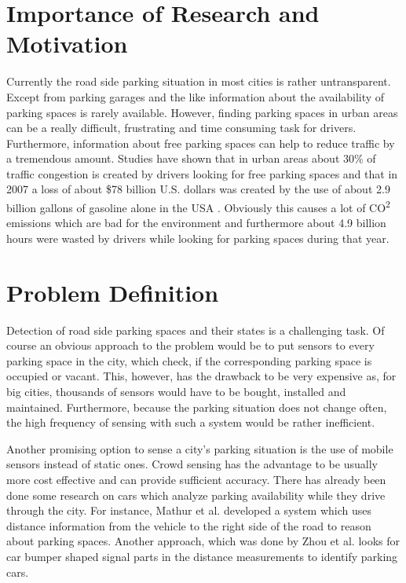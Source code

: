 \documentclass[11pt,a4paper,titlepage,
chapterprefix,headsepline,parskip,pdftex,
,pointlessnumbers,bibtotoc]{article}
\begin{document}


%
%
%
%

\newpage
{}

\section{Importance of Research and Motivation}
Currently the road side parking situation in most cities is rather untransparent. Except from parking garages and the like information about the availability of parking spaces is rarely available. However, finding parking spaces in urban areas can be a really difficult, frustrating and time consuming task for drivers. Furthermore, information about free parking spaces can help to reduce traffic by a tremendous amount. Studies have shown that in urban areas about 30\% of traffic congestion is created by drivers looking for free parking spaces \cite{Nawaz:2013:PSB:2500423.2500438} and that in 2007 a loss of about \$78 billion U.S. dollars was created by the use of about 2.9 billion gallons of gasoline alone in the USA \cite{TexasMobilityReport}. Obviously this causes a lot of CO\textsuperscript{2} emissions which are bad for the environment and furthermore about 4.9 billion hours were wasted by drivers while looking for parking spaces during that year. 

\section{Problem Definition}

Detection of road side parking spaces and their states is a challenging task. Of course an obvious approach to the problem would be to put sensors to every parking space in the city, which check, if the corresponding parking space is occupied or vacant. This, however, has the drawback to be very expensive as, for big cities, thousands of sensors would have to be bought, installed and maintained. Furthermore, because the parking situation does not change often, the high frequency of sensing with such a system would be rather inefficient.

Another promising option to sense a city's parking situation is the use of mobile sensors instead of static ones. Crowd sensing has the advantage to be usually more cost effective and can provide sufficient accuracy.
There has already been done some research on cars which analyze parking availability while they drive through the city. For instance, Mathur et al. \cite{Mathur:2010:PDS:1814433.1814448} developed a system which uses distance information from the vehicle to the right side of the road to reason about parking spaces. Another approach, which was done by Zhou et al. \cite{Zhou_2d_range} looks for car bumper shaped signal parts in the distance measurements to identify parking cars.
\end{document}
